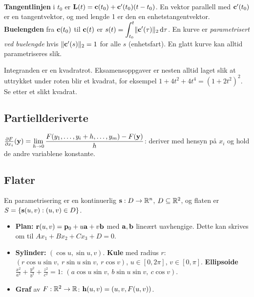 \begin{defn}
\textbf{Tangentlinjen} i $t_0$ er $\mathbf{L}(t)=\mathbf{c}(t_0)+\mathbf{c}'(t_0)(t-t_0)$. En vektor parallell med $\mathbf{c}'(t_0)$ er en tangentvektor, og med lengde 1 er den en enhetstangentvektor.\\
\textbf{Buelengden} fra $\mathbf{c}(t_0)$ til $\mathbf{c}(t)$ er $s(t)=\displaystyle\int_{t_0}^{t}\lVert \mathbf{c}'(\tau)\rVert_2\,\mathrm{d}\tau$.
En kurve er \emph{parametrisert ved buelengde} hvis $\lVert \mathbf{c}'(s)\rVert_2=1$ for alle $s$ (enhetsfart). En glatt kurve kan alltid parametriseres slik.
\end{defn}
\begin{fallgruve}
Integranden er en kvadratrot. Eksamensoppgaver er nesten alltid laget slik at uttrykket under roten blir et kvadrat, for eksempel $1+4t^2+4t^4=(1+2t^2)^2$. Se etter et slikt kvadrat.
\end{fallgruve}



\subsection{Partiellderiverte}
\begin{defn}
$\frac{\partial F}{\partial x_i}(\mathbf{y})=\displaystyle\lim_{h\to0}\frac{F(y_1,\dots,y_i+h,\dots,y_m)-F(\mathbf{y})}{h}$: deriver med hensyn på $x_i$ og hold de andre variablene konstante.
\end{defn}

\subsection{Flater}
\begin{defn}
En parametrisering er en kontinuerlig $\mathbf{s}:D\to\mathbb{R}^n$, $D\subseteq\mathbb{R}^2$, og flaten er $S=\{\mathbf{s}(u,v):(u,v)\in D\}$.
\end{defn}
\begin{itemize}
  \item \textbf{Plan:} $\mathbf{r}(u,v)=\mathbf{p}_0+u\mathbf{a}+v\mathbf{b}$ med $\mathbf{a},\mathbf{b}$ lineært uavhengige. Dette kan skrives om til $Ax_1+Bx_2+Cx_3+D=0$.
  \item \textbf{Sylinder:} $(\cos u,\sin u,v)$. \textbf{Kule} med radius $r$: $(r\cos u\sin v,\ r\sin u\sin v,\ r\cos v)$, $u\in[0,2\pi]$, $v\in[0,\pi]$. \textbf{Ellipsoide} $\tfrac{x^2}{a^2}+\tfrac{y^2}{b^2}+\tfrac{z^2}{c^2}=1$: $(a\cos u\sin v,\ b\sin u\sin v,\ c\cos v)$.
  \item \textbf{Graf} av $F:\mathbb{R}^2\to\mathbb{R}$: $\mathbf{h}(u,v)=(u,v,F(u,v))$.
\end{itemize}


